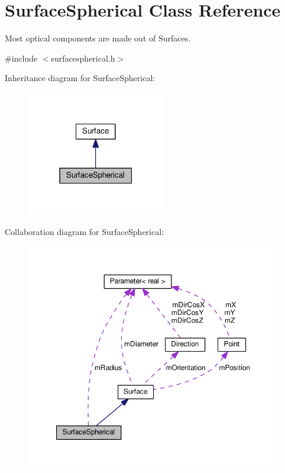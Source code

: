 \hypertarget{classSurfaceSpherical}{}\section{Surface\+Spherical Class Reference}
\label{classSurfaceSpherical}


Most optical components are made out of Surfaces.  




{\ttfamily \#include $<$surfacespherical.\+h$>$}



Inheritance diagram for Surface\+Spherical\+:\nopagebreak
\begin{figure}[H]
\begin{center}
\leavevmode
\includegraphics[width=171pt]{classSurfaceSpherical__inherit__graph}
\end{center}
\end{figure}


Collaboration diagram for Surface\+Spherical\+:
\nopagebreak
\begin{figure}[H]
\begin{center}
\leavevmode
\includegraphics[width=350pt]{classSurfaceSpherical__coll__graph}
\end{center}
\end{figure}
